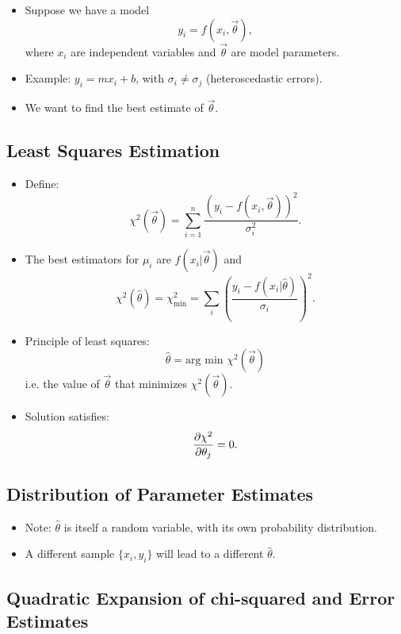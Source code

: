 \begin{itemize}
      \item Suppose we have a model
            \[
                  y_i = f(x_i, \vec{\theta}),
            \]
            where $x_i$ are independent variables and $\vec{\theta}$ are model parameters.
      \item Example: $y_i = m x_i + b$, with $\sigma_i \neq \sigma_j$ (heteroscedastic errors).
      \item We want to find the best estimate of $\vec{\theta}$.
\end{itemize}

\subsection{Least Squares Estimation}

\begin{itemize}
      \item Define:
            \[
                  \chi^2(\vec{\theta}) = \sum_{i=1}^{n} \frac{(y_i - f(x_i, \vec{\theta}))^2}{\sigma_i^2} .
            \]
      \item The best estimators for $\mu_i$ are $f(x_i|\vec{\theta})$ and
            \[
                  \chi^2(\hat{\theta}) = \chi^2_{\text{min}} = \sum_i \left( \frac{y_i - f(x_i|\hat{\theta})}{\sigma_i} \right)^2 .
            \]
      \item Principle of least squares:
            \[
                  \hat{\theta} = \text{arg min } \chi^2(\vec{\theta})
            \]
            i.e. the value of $\vec{\theta}$ that minimizes $\chi^2(\vec{\theta})$.
      \item Solution satisfies:
            \[
                  \pdv{\chi^2}{\theta_j} = 0 .
            \]
\end{itemize}

\subsection{Distribution of Parameter Estimates}

\begin{itemize}
      \item Note: $\hat{\theta}$ is itself a random variable, with its own probability distribution.
      \item A different sample $\{x_i, y_i\}$ will lead to a different $\hat{\theta}$.
\end{itemize}

\subsection{Quadratic Expansion of chi-squared and Error Estimates}

